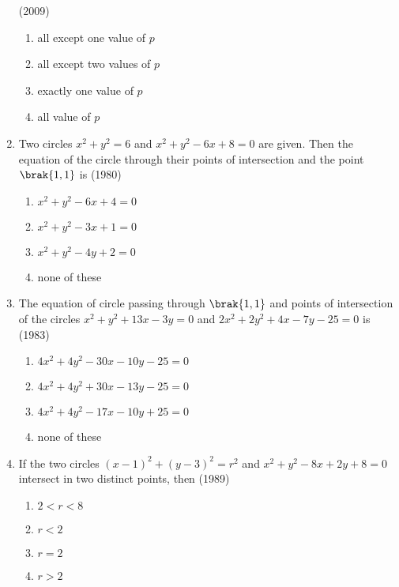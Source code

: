 \begin{enumerate}[label=\thesubsection.\arabic*.,ref=\thesubsection.\theenumi]
\hfill{(2009)}
\begin{multicols}{2}
\begin{enumerate}
\item all except one value of $p$
\item all except two values of $p$
\item exactly one value of $p$
\item all value of $p$
\end{enumerate}
\end{multicols}
    \item Two circles $x^{2} + y^{2} = 6$ and $x^{2} + y^{2}-6x +8=0$ are given. Then the equation of the circle through their points of intersection and the point $\brak{1, 1}$ is \hfill {(1980)}
    \begin{multicols}{2}
\begin{enumerate}
    	\item $x^{2}+y^{2}-6x+4=0$ 
    	\item $x^{2}+y^{2}-3x+1=0$
    	\item $x^{2}+y^{2}-4y+2=0$
    	\item none of these
    \end{enumerate}
\end{multicols}
    \item The equation of circle passing through $\brak{1, 1}$ and points of intersection of the circles $x^{2}+y^{2}+13x-3y=0$ and $2x^{2}+2y^{2}+4x-7y-25=0$ is
    \hfill {(1983)}
    \begin{multicols}{2}
\begin{enumerate}
    	\item $4x^{2}+4y^{2}-30x-10y-25=0$
    	\item $4x^{2}+4y^{2}+30x-13y-25=0$
    	\item $4x^{2}+4y^{2}-17x-10y+25=0$
    	\item none of these
    \end{enumerate}
\end{multicols}
    \item If the two circles $(x-1)^{2} + (y-3)^{2} = r^{2}$ and $x^{2}+y^{2}-8x+2y+8=0$ intersect in two distinct points,  then \hfill {(1989)} 
    \begin{multicols}{4}
\begin{enumerate}
    	\item $2<r<8$
    	\item $r<2$
    	\item $r=2$
    	\item $r>2$
    \end{enumerate}

\end{multicols}
\end{enumerate}
